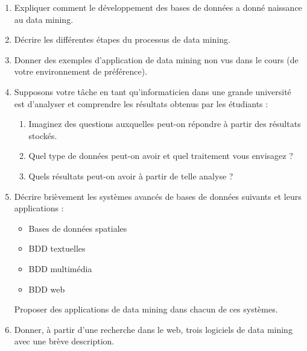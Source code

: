 \documentclass[a4paper,14pt]{article}
\begin{document}
    \begin{enumerate}[leftmargin=*, label=\arabic*)]
        \item Expliquer comment le développement des bases de données a donné naissance au data mining.
        
        \item Décrire les différentes étapes du processus de data mining.
        
        \item Donner des exemples d'application de data mining non vus dans le cours (de votre environnement de préférence).
        
        \item Supposons votre tâche en tant qu'informaticien dans une grande université est d'analyser et comprendre les résultats obtenus par les étudiants :
        \begin{enumerate}[label=\alph*)]
            \item Imaginez des questions auxquelles peut-on répondre à partir des résultats stockés.
            \item Quel type de données peut-on avoir et quel traitement vous envisagez ?
            \item Quels résultats peut-on avoir à partir de telle analyse ?
        \end{enumerate}
        
        \item Décrire brièvement les systèmes avancés de bases de données suivants et leurs applications : 
        \begin{itemize}[leftmargin=4mm]
            \item Bases de données spatiales
            \item BDD textuelles
            \item BDD multimédia
            \item BDD web
        \end{itemize}
        Proposer des applications de data mining dans chacun de ces systèmes.
        
        \item Donner, à partir d'une recherche dans le web, trois logiciels de data mining avec une brève description.
    \end{enumerate}
    
 \newpage
 

 
\end{document}
